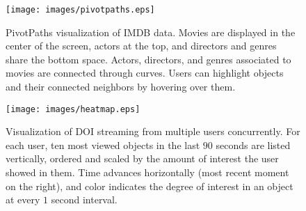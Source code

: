 \begin{figure}[htb]
  \centering
  \texttt{[image: images/pivotpaths.eps]}
  \caption{PivotPaths visualization of IMDB data. Movies are displayed in the center of the screen, actors at the top, and directors and genres share the bottom space. Actors, directors, and genres associated to movies are connected through curves. Users can highlight objects and their connected neighbors by hovering over them.}
	\label{fig:pivotpaths}
\end{figure}

\begin{figure}[htb]
  \centering
  \texttt{[image: images/heatmap.eps]}
  \caption{Visualization of DOI streaming from multiple users concurrently. For each user, ten most viewed objects in the last $90$ seconds are listed vertically, ordered and scaled by the amount of interest the user showed in them. Time advances horizontally (most recent moment on the right), and color indicates the degree of interest in an object at every $1$ second interval.}
	\label{fig:heatmap}
\end{figure}


